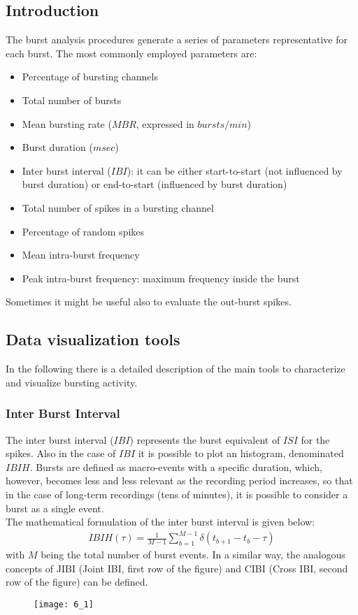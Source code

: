 \subsection{Introduction}
The burst analysis procedures generate a series of parameters representative for
each burst. The most commonly employed parameters are:
\begin{itemize}
    \item Percentage of bursting channels
    \item Total number of bursts
    \item Mean bursting rate (\(MBR\), expressed in \(bursts/min\))
    \item Burst duration (\(msec\))
    \item Inter burst interval (\(IBI\)): it can be either start-to-start (not
          influenced by burst duration) or end-to-start (influenced by burst duration)
    \item Total number of spikes in a bursting channel
    \item Percentage of random spikes
    \item Mean intra-burst frequency
    \item Peak intra-burst frequency: maximum frequency inside the burst
\end{itemize}
Sometimes it might be useful also to evaluate the out-burst spikes.

\subsection{Data visualization tools}
In the following there is a detailed description of the main tools to characterize and
visualize bursting activity.
\subsubsection{Inter Burst Interval}
The inter burst interval (\(IBI\)) represents the burst equivalent of \(ISI\) for the
spikes. Also in the case of \(IBI\) it is possible to plot an histogram, denominated \(IBIH\).
Bursts are defined as macro-events with a specific duration, which, however, becomes less and
less relevant as the recording period increases, so that in the case of long-term recordings
(tens of minutes), it is possible to consider a burst as a single event.\\
The mathematical formulation of the inter burst interval is given below:
\begin{align*}
    IBIH(\tau)=\frac{1}{M-1}\sum_{b=1}^{M-1}\delta(t_{b+1}-t_{b}-\tau)
\end{align*}
with \(M\) being the total number of burst events.
In a similar way, the analogous concepts of JIBI (Joint IBI, first row of the figure)
and CIBI (Cross IBI, second row of the figure) can be defined.
\begin{figure}[H]
    \texttt{[image: 6\_1]}
    \centering
\end{figure}
